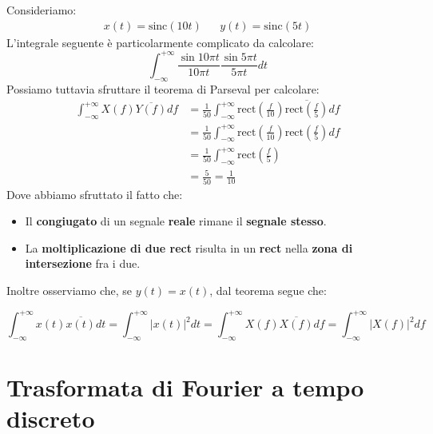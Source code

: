\begin{exa}
    Consideriamo:
    \[
        \begin{aligned}
            x(t) = \text{sinc}(10t) & & y(t) = \text{sinc}(5t)
        \end{aligned}
    \] 
    L'integrale seguente è particolarmente complicato da calcolare:
    \[
        \int_{-\infty}^{+\infty} \frac{\sin 10\pi t}{10\pi t} \frac{\sin 5\pi t}{5\pi t} dt
    \] 
    Possiamo tuttavia sfruttare il teorema di Parseval per calcolare:
    \[
        \begin{aligned}
            \int_{-\infty}^{+\infty} X(f) \overline{Y(f)} df &= 
            \frac{1}{50} \int_{-\infty}^{+\infty} \text{rect} \left( \frac{f}{10} \right)
            \overline{ \text{rect} \left( \frac{f}{5} \right) } df \\ 
            &= \frac{1}{50} \int_{-\infty}^{+\infty} \text{rect} \left( \frac{f}{10} \right)
            \text{rect} \left( \frac{f}{5} \right) df \\ 
            &= \frac{1}{50} \int_{-\infty}^{+\infty} \text{rect} \left( \frac{f}{5} \right) \\ 
            &= \frac{5}{50} = \frac{1}{10}
        \end{aligned}
    \] 
    Dove abbiamo sfruttato il fatto che:
    \begin{itemize}
        \item Il \textbf{congiugato} di un segnale \textbf{reale} 
            rimane il \textbf{segnale stesso}.
        \item La \textbf{moltiplicazione di due rect} risulta in un \textbf{rect}
            nella \textbf{zona di intersezione} fra i due.
    \end{itemize}
\end{exa}

Inoltre osserviamo che, se $y(t) = x(t)$, dal teorema segue che:

\begin{prop}
    \[
        \int_{-\infty}^{+\infty} x(t) \overline{x(t)} dt = 
        \int_{-\infty}^{+\infty} |x(t)|^2 dt =
        \int_{-\infty}^{+\infty} X(f) \overline{X(f)} df =
        \int_{-\infty}^{+\infty} |X(f)|^2 df
    \] 
\end{prop}

\section{Trasformata di Fourier a tempo discreto}

